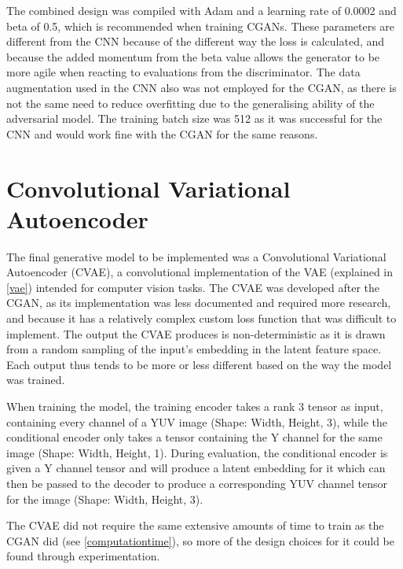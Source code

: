 \documentclass{l4proj}
\begin{document}
The combined design was compiled with Adam and a learning rate of 0.0002 and beta of 0.5, which is recommended when training CGANs\cite{GANTips}. These parameters are different from the CNN because of the different way the loss is calculated, and because the added momentum from the beta value allows the generator to be more agile when reacting to evaluations from the discriminator. The data augmentation used in the CNN also was not employed for the CGAN, as there is not the same need to reduce overfitting due to the generalising ability of the adversarial model. The training batch size was 512 as it was successful for the CNN and would work fine with the CGAN for the same reasons.



\section{Convolutional Variational Autoencoder}
\label{vae-implementation}
The final generative model to be implemented was a Convolutional Variational Autoencoder (CVAE), a convolutional implementation of the VAE (explained in \ref{vae}) intended for computer vision tasks. The CVAE was developed after the CGAN, as its implementation was less documented and required more research, and because it has a relatively complex custom loss function that was difficult to implement. The output the CVAE produces is non-deterministic as it is drawn from a random sampling of the input's embedding in the latent feature space. Each output thus tends to be more or less different based on the way the model was trained.

When training the model, the training encoder takes a rank 3 tensor as input, containing every channel of a YUV image (Shape: Width, Height, 3), while the conditional encoder only takes a tensor containing the Y channel for the same image (Shape: Width, Height, 1). During evaluation, the conditional encoder is given a Y channel tensor and will produce a latent embedding for it which can then be passed to the decoder to produce a corresponding YUV channel tensor for the image (Shape: Width, Height, 3).

The CVAE did not require the same extensive amounts of time to train as the CGAN did (see \ref{computationtime}), so more of the design choices for it could be found through experimentation.
\end{document}
